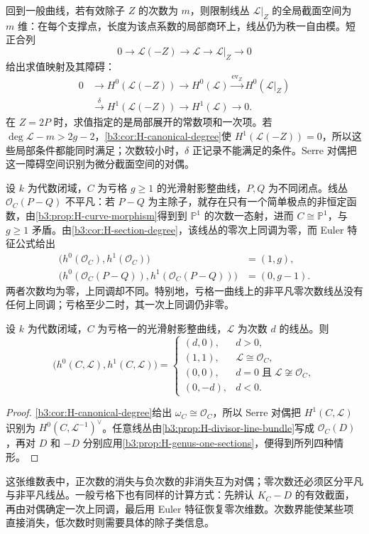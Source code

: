 \ProseParagraphBreak
回到一般曲线，若有效除子 \(Z\) 的次数为 \(m\)，则限制线丛 \(\mathcal L|_Z\) 的全局截面空间为 \(m\) 维：在每个支撑点，长度为该点系数的局部商环上，线丛仍为秩一自由模。短正合列
\[
	0\longrightarrow\mathcal L(-Z)\longrightarrow\mathcal L
	\longrightarrow\mathcal L|_Z\longrightarrow0
\]
给出求值映射及其障碍：
\[
	\begin{aligned}
		0&\longrightarrow H^0(\mathcal L(-Z))\longrightarrow H^0(\mathcal L)
		\xrightarrow{\mathrm{ev}_Z}H^0(\mathcal L|_Z)\\
		&\xrightarrow{\delta}H^1(\mathcal L(-Z))\longrightarrow H^1(\mathcal L)
		\longrightarrow0.
	\end{aligned}
\]
在 \(Z=2P\) 时，求值指定的是局部展开的常数项和一次项。若 \(\deg\mathcal L-m>2g-2\)，\cref{b3:cor:H-canonical-degree}使 \(H^1(\mathcal L(-Z))=0\)，所以这些局部条件都能同时满足；次数较小时，\(\delta\) 正记录不能满足的条件。Serre 对偶把这一障碍空间识别为微分截面空间的对偶。

\begin{example}[次数为零的两种上同调]\label{b3:exm:H-degree-zero-cohomology}
	设 \(k\) 为代数闭域，\(C\) 为亏格 \(g\ge1\) 的光滑射影整曲线，\(P,Q\) 为不同闭点。线丛 \(\mathcal O_C(P-Q)\) 不平凡：若 \(P-Q\) 为主除子，就存在只有一个简单极点的非恒定函数，由\cref{b3:prop:H-curve-morphism}得到到 \(\mathbb P^1\) 的次数一态射，进而 \(C\cong\mathbb P^1\)，与 \(g\ge1\) 矛盾。由\cref{b3:cor:H-section-degree}，该线丛的零次上同调为零，而 Euler 特征公式给出
	\[
		\begin{aligned}
			\bigl(h^0(\mathcal O_C),h^1(\mathcal O_C)\bigr)&=(1,g),\\
			\bigl(h^0(\mathcal O_C(P-Q)),h^1(\mathcal O_C(P-Q))\bigr)&=(0,g-1).
		\end{aligned}
	\]
	两者次数均为零，上同调却不同。特别地，亏格一曲线上的非平凡零次数线丛没有任何上同调；亏格至少二时，其一次上同调仍非零。
\end{example}

\begin{proposition}\label{b3:prop:H-genus-one-cohomology}
	设 \(k\) 为代数闭域，\(C\) 为亏格一的光滑射影整曲线，\(\mathcal L\) 为次数 \(d\) 的线丛。则
	\[
		\bigl(h^0(C,\mathcal L),h^1(C,\mathcal L)\bigr)=
		\begin{cases}
			(d,0),&d>0,\\
			(1,1),&\mathcal L\cong\mathcal O_C,\\
			(0,0),&d=0\;\text{且}\;\mathcal L\not\cong\mathcal O_C,\\
			(0,-d),&d<0.
		\end{cases}
	\]
\end{proposition}
\begin{proof}
	\cref{b3:cor:H-canonical-degree}给出 \(\omega_C\cong\mathcal O_C\)，所以 Serre 对偶把 \(H^1(C,\mathcal L)\) 识别为 \(H^0(C,\mathcal L^{-1})^\vee\)。任意线丛由\cref{b3:prop:H-divisor-line-bundle}写成 \(\mathcal O_C(D)\)，再对 \(D\) 和 \(-D\) 分别应用\cref{b3:prop:H-genus-one-sections}，便得到所列四种情形。
\end{proof}

这张维数表中，正次数的消失与负次数的非消失互为对偶；零次数还必须区分平凡与非平凡线丛。一般亏格下也有同样的计算方式：先辨认 \(K_C-D\) 的有效截面，再由对偶确定一次上同调，最后用 Euler 特征恢复零次维数。次数界能使某些项直接消失，低次数时则需要具体的除子类信息。


